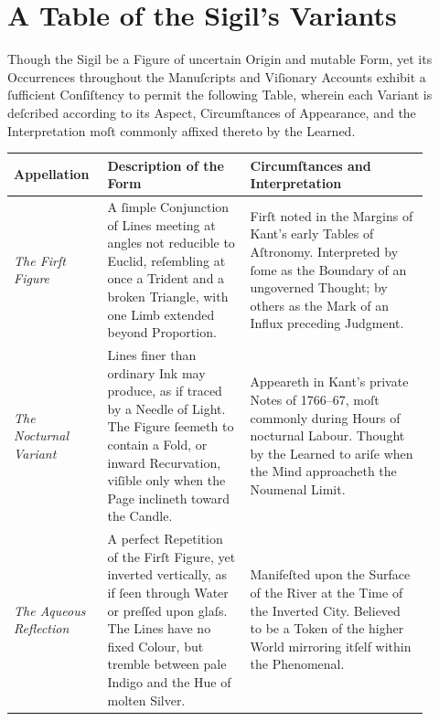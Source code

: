 \documentclass[12pt]{article}
\begin{document}
\newpage

\section*{A Table of the Sigil’s Variants}

Though the Sigil be a Figure of uncertain Origin and mutable Form, yet its 
Occurrences throughout the Manuſcripts and Viſionary Accounts exhibit a 
ſufficient Conſiſtency to permit the following Table, wherein each Variant is 
deſcribed according to its Aspect, Circumſtances of Appearance, and the 
Interpretation moſt commonly affixed thereto by the Learned.

\vspace{1em}

\begin{center}
\begin{tabular}{|p{0.18\linewidth}|p{0.32\linewidth}|p{0.40\linewidth}|}
\hline
\textbf{Appellation} & \textbf{Description of the Form} & \textbf{Circumſtances and Interpretation} \\
\hline

\textit{The Firſt Figure} &
A ſimple Conjunction of Lines meeting at angles not reducible to Euclid, 
reſembling at once a Trident and a broken Triangle, with one Limb extended 
beyond Proportion. &
Firſt noted in the Margins of Kant’s early Tables of Aſtronomy. 
Interpreted by ſome as the Boundary of an ungoverned Thought; by others as 
the Mark of an Influx preceding Judgment. \\
\hline

\textit{The Nocturnal Variant} &
Lines finer than ordinary Ink may produce, as if traced by a Needle of 
Light. The Figure ſeemeth to contain a Fold, or inward Recurvation, 
viſible only when the Page inclineth toward the Candle. &
Appeareth in Kant’s private Notes of 1766--67, moſt commonly during Hours 
of nocturnal Labour. Thought by the Learned to ariſe when the Mind 
approacheth the Noumenal Limit. \\
\hline

\textit{The Aqueous Reflection} &
A perfect Repetition of the Firſt Figure, yet inverted vertically, as if 
ſeen through Water or preſſed upon glaſs. The Lines have no fixed Colour, 
but tremble between pale Indigo and the Hue of molten Silver. &
Manifeſted upon the Surface of the River at the Time of the Inverted City. 
Believed to be a Token of the higher World mirroring itſelf within the 
Phenomenal. \\
\hline


\end{tabular}
\end{center}
\end{document}
